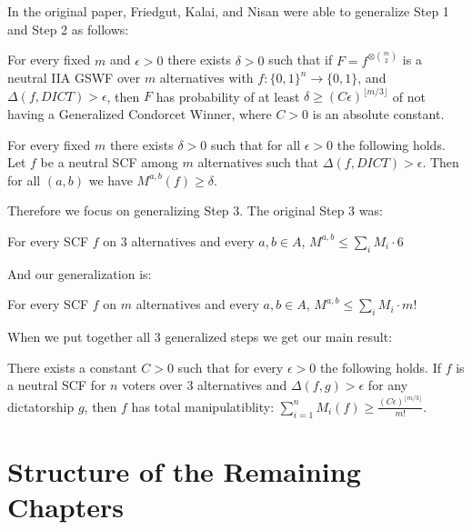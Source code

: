 	In the original paper, Friedgut, Kalai, and Nisan were able to generalize Step 1 and Step 2 as follows:

	\begin{lemma}
		For every fixed $m$ and $\epsilon > 0$ there exists $\delta > 0$ such that if $F = f^{\otimes \binom{m}{2}}$ is a neutral IIA GSWF over $m$ alternatives with $f : \{0,1\}^n \rightarrow \{0,1\}$, and $\Delta(f, DICT) > \epsilon$, then $F$ has probability of at least $\delta \ge (C\epsilon)^{\lfloor m/3 \rfloor}$ of not having a Generalized Condorcet Winner, where $C > 0$ is an absolute constant.
	\end{lemma}

	\begin{lemma}
		For every fixed $m$ there exists $\delta > 0$ such that for all $\epsilon > 0$ the following holds. Let $f$ be a neutral SCF among $m$ alternatives such that $\Delta(f, DICT) > \epsilon$. Then for all $(a,b)$ we have $M^{a,b}(f) \ge \delta$.
	\end{lemma}

	Therefore we focus on generalizing Step 3. The original Step 3 was:

	\begin{lemma}
		For every SCF $f$ on $3$ alternatives and every $a,b \in A$, $M^{a,b} \le \sum_i M_i \cdot 6$
	\end{lemma}

	And our generalization is:

	\begin{lemma}
		For every SCF $f$ on $m$ alternatives and every $a,b \in A$, $M^{a,b} \le \sum_i M_i \cdot m!$
	\end{lemma}

	When we put together all 3 generalized steps we get our main result:
	\begin{theorem}
		There exists a constant $C > 0$ such that for every $\epsilon > 0$ the following holds. If $f$ is a neutral SCF for $n$ voters over 3 alternatives and $\Delta(f, g) > \epsilon$ for any dictatorship $g$, then $f$ has total manipulatiblity: $\sum^n_{i=1} M_i(f) \ge \frac{(C\epsilon)^{\lfloor m/3 \rfloor}}{m!}$.
	\end{theorem}


\section{Structure of the Remaining Chapters}

